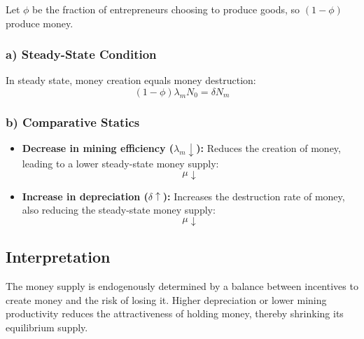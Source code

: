 \documentclass[11pt, a4paper]{article}
\begin{document}
Let $\phi$ be the fraction of entrepreneurs choosing to produce goods, so $(1-\phi)$ produce money.

\subsubsection*{a) Steady-State Condition}

In steady state, money creation equals money destruction:
\begin{equation}
    (1-\phi)\lambda_m N_0 = \delta N_m
\end{equation}

\subsubsection*{b) Comparative Statics}

\begin{itemize}
    \item \textbf{Decrease in mining efficiency ($\lambda_m \downarrow$):} Reduces the creation of money, leading to a lower steady-state money supply:
    \[
    \mu \downarrow
    \]

    \item \textbf{Increase in depreciation ($\delta \uparrow$):} Increases the destruction rate of money, also reducing the steady-state money supply:
    \[
    \mu \downarrow
    \]
\end{itemize}

\subsection*{Interpretation}

The money supply is endogenously determined by a balance between incentives to create money and the risk of losing it. Higher depreciation or lower mining productivity reduces the attractiveness of holding money, thereby shrinking its equilibrium supply.
\end{document}

